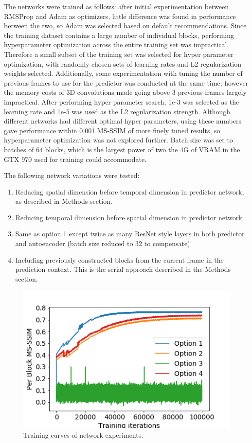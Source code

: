 \documentclass[10pt,twocolumn,letterpaper]{article}
\begin{document}
The networks were trained as follows: after initial experimentation between RMSProp and Adam as optimizers, little difference was found in performance between the two, so Adam was selected based on default recommendations. Since the training dataset contains a large number of individual blocks, performing hyperparameter optimization across the entire training set was impractical. Therefore a small subset of the training set was selected for hyper parameter optimization, with randomly chosen sets of learning rates and L2 regularization weights selected. Additionally, some experimentation with tuning the number of previous frames to use for the predictor was conducted at the same time; however the memory costs of 3D convolutions made going above 3 previous frames largely impractical. After performing hyper parameter search, 1e-3 was selected as the learning rate and 1e-5 was used as the L2 regularization strength. Although different networks had different optimal hyper parameters, using these numbers gave performance within 0.001 MS-SSIM of more finely tuned results, so hyperparameter optimization was not explored further. Batch size was set to batches of 64 blocks, which is the largest power of two the 4G of VRAM in the GTX 970 used for training could accommodate.

The following network variations were tested:
\begin{enumerate}
  \item
    Reducing spatial dimension before temporal dimension in predictor network, as described in Methods section.
  \item
    Reducing temporal dimension before spatial dimension in predictor network.
  \item
    Same as option 1 except twice as many ResNet style layers in both predictor and autoencoder (batch size reduced to 32 to compensate)
  \item
    Including previously constructed blocks from the current frame in the prediction context. This is the serial approach described in the Methods section.
\end{enumerate}

\begin{figure}[t]
\begin{center}
  \includegraphics[width=0.8\linewidth]{graph}
\end{center}
   \caption{Training curves of network experiments.}
   \label{fig:plt}
\end{figure}
\end{document}
